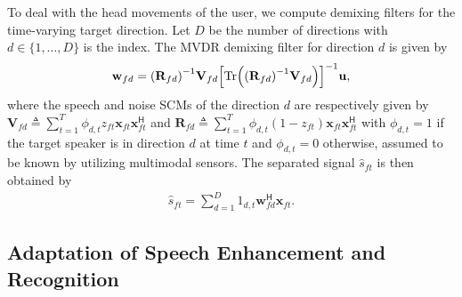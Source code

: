 \documentclass[a4paper]{article}
\newcommand{\R}{\R}
\newcommand{\sscm}{\V}
\def\hr{\mathsf{H}}
\def\Tr{\mathrm{Tr}}
\def\R{\mathbf{R}}
\def\V{\mathbf{V}}
\def\u{\mathbf{u}}
\def\w{\mathbf{w}}
\def\x{\mathbf{x}}
\begin{document}
To deal with the head movements of the user, we compute demixing filters for the time-varying target direction.
Let $D$ be the number of directions with 
$d \!\in\! \{1, \ldots, D\}$ is the index.
The MVDR demixing filter for direction $d$ is given by
\begin{align}
  \w_{fd} = \qty(\R_{fd})^{-1}\sscm_{fd} \qty[\Tr \qty(\qty(\R_{fd})^{-1}\sscm_{fd})]^{-1}\u ,
\end{align}
where
 the speech and noise SCMs of the direction $d$ are respectively given by
$\sscm_{fd} \!\triangleq\! 
    \sum_{t=1}^T \phi_{d,t} z_{ft} \x_{ft} \x_{ft}^\hr$ and
$\R_{fd} \!\triangleq\! 
    \sum_{t=1}^T \phi_{d,t} (1 - z_{ft}) \x_{ft} \x_{ft}^\hr$ with
$\phi_{d,t} = 1$ if the target speaker is in direction $d$ at time $t$
and $\phi_{d,t} = 0$ otherwise,
assumed to be known by utilizing multimodal sensors.
The separated signal $\hat{s}_{ft}$ is then obtained by
\begin{align}
  \hat{s}_{ft} = \sum_{d=1}^D 1_{d,t} \w_{fd}^\hr \x_{ft}.
\end{align}

\subsection{Adaptation of Speech Enhancement and Recognition}
\label{sec:domain_adaptation}
\end{document}
